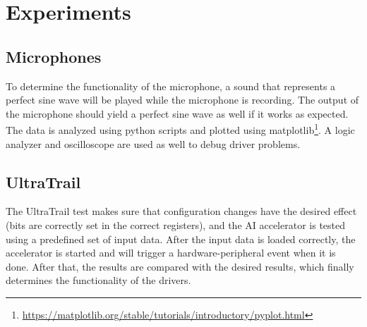 \section{Experiments}

\subsection{Microphones}

To determine the functionality of the microphone, a sound that represents a perfect sine wave will be
played while the microphone is recording.
The output of the microphone should yield a perfect sine wave as well if it works as expected.\\
The data is analyzed using python scripts and plotted using matplotlib\footnote{\url{https://matplotlib.org/stable/tutorials/introductory/pyplot.html}}.
A logic analyzer and oscilloscope are used as well to debug driver problems.

\subsection{UltraTrail}

The UltraTrail test makes sure that configuration changes have the desired effect (bits are correctly set in the correct registers),
and the AI accelerator is tested using a predefined set of input data.
After the input data is loaded correctly, the accelerator is started and will trigger a hardware-peripheral event when it is done.
After that, the results are compared with the desired results, which finally determines the functionality of the drivers.
